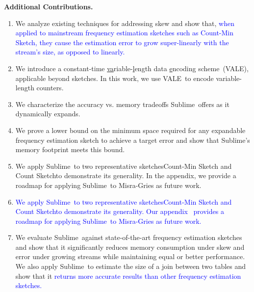 \documentclass[sigconf]{acmart}
\newcommand{\sketch}{Sublime}
\newcommand{\counterencodingabbrv}{VALE}
\begin{document}
\textbf{Additional Contributions.}
\begin{enumerate}
    \item We analyze existing techniques for addressing skew and show that,
        \textcolor{blue}{when applied to mainstream frequency estimation
        sketches such as Count-Min Sketch, they cause the estimation error to
        grow super-linearly with the stream’s size, as opposed to linearly.}
    \item We introduce a constant-time \underline{va}riable-\underline{l}ength
        data \underline{e}ncoding scheme~(\counterencodingabbrv), applicable
        beyond sketches. In this work, we use \counterencodingabbrv\ to encode
        variable-length counters.
    \item We characterize the accuracy vs. memory tradeoffs \sketch\ offers as
        it dynamically expands.
    \item We prove a lower bound on the minimum space required for any
        expandable frequency estimation sketch to achieve a target error and
        show that \sketch's memory footprint meets this bound.
    \ifappendix
    \item We apply \sketch\ to two representative
      sketches{\textemdash}Count-Min Sketch and Count Sketch{\textemdash}to
      demonstrate its generality. In the appendix, we provide a roadmap for
      applying \sketch\ to Misra-Gries as future work.
    \else 
    \item \textcolor{blue}{We apply \sketch\ to two representative
      sketches{\textemdash}Count-Min Sketch and Count Sketch{\textemdash}to
      demonstrate its generality. Our appendix~\cite{SublimeArxiv} provides a
      roadmap for applying \sketch\ to Misra-Gries as future work.}
    \fi
    \item We evaluate \sketch\ against state-of-the-art frequency estimation
      sketches and show that it significantly reduces memory consumption under
      skew and error under growing streams while maintaining equal or better
      performance. We also apply \sketch\ to estimate the size of a join
      between two tables and show that it \textcolor{blue}{returns more
      accurate results than other frequency estimation sketches.}
\end{enumerate}
\vspace{-2mm}
\end{document}
